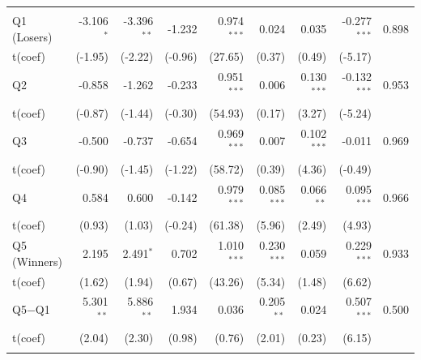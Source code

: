 \begin{table}[!htbp]
{\begin{tabular*}{\linewidth}{@{\extracolsep{\fill}}lrrrrrrrr}
\addlinespace[0.3em]
\hline
\multicolumn{9}{l}{Active --- VW}\\
\hspace{1em}Q1 (Losers) & -3.106$^{*}$ & -3.396$^{**}$ & -1.232 & 0.974$^{***}$ & 0.024 & 0.035 & -0.277$^{***}$ & 0.898\\
\hspace{1em}t(coef) & (-1.95) & (-2.22) & (-0.96) & (27.65) & (0.37) & (0.49) & (-5.17) & \\
\hspace{1em}Q2 & -0.858 & -1.262 & -0.233 & 0.951$^{***}$ & 0.006 & 0.130$^{***}$ & -0.132$^{***}$ & 0.953\\
\hspace{1em}t(coef) & (-0.87) & (-1.44) & (-0.30) & (54.93) & (0.17) & (3.27) & (-5.24) & \\
\hspace{1em}Q3 & -0.500 & -0.737 & -0.654 & 0.969$^{***}$ & 0.007 & 0.102$^{***}$ & -0.011 & 0.969\\
\hspace{1em}t(coef) & (-0.90) & (-1.45) & (-1.22) & (58.72) & (0.39) & (4.36) & (-0.49) & \\
\hspace{1em}Q4 & 0.584 & 0.600 & -0.142 & 0.979$^{***}$ & 0.085$^{***}$ & 0.066$^{**}$ & 0.095$^{***}$ & 0.966\\
\hspace{1em}t(coef) & (0.93) & (1.03) & (-0.24) & (61.38) & (5.96) & (2.49) & (4.93) & \\
\hspace{1em}Q5 (Winners) & 2.195 & 2.491$^{*}$ & 0.702 & 1.010$^{***}$ & 0.230$^{***}$ & 0.059 & 0.229$^{***}$ & 0.933\\
\hspace{1em}t(coef) & (1.62) & (1.94) & (0.67) & (43.26) & (5.34) & (1.48) & (6.62) & \\
\hspace{1em}Q5$-$Q1 & 5.301$^{**}$ & 5.886$^{**}$ & 1.934 & 0.036 & 0.205$^{**}$ & 0.024 & 0.507$^{***}$ & 0.500\\
\hspace{1em}t(coef) & (2.04) & (2.30) & (0.98) & (0.76) & (2.01) & (0.23) & (6.15) & \\
\addlinespace[0.3em]
\hline
\bottomrule
\end{tabular*}%
}\sbefit
\fi
\setlength{\tabletempwidth}{\wd\tabletempbox}
\ifdim\tabletempwidth>\linewidth\setlength{\tabletempwidth}{\linewidth}\fi
\begin{minipage}{\tabletempwidth}
\captionsetup{width=\linewidth}

\end{minipage}
\end{table}

